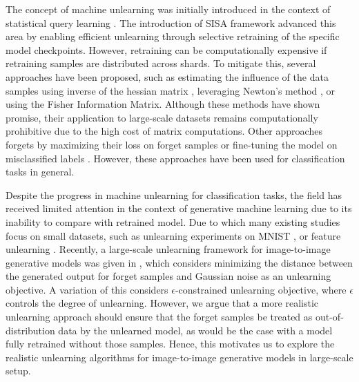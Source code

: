 
The concept of machine unlearning was initially introduced in the context of statistical query learning \cite{cao2015towards}. The introduction of SISA framework \cite{bourtoule2021machine} advanced this area by enabling efficient unlearning through selective retraining of the specific model checkpoints. However, retraining can be computationally expensive if retraining samples are distributed across shards. To mitigate this, several approaches have been proposed, such as estimating the influence of the data samples using inverse of the hessian matrix \cite{golatkar2020eternal}, leveraging Newton’s method \cite{guo2019certified}, or using the Fisher Information Matrix. Although these methods have shown promise, their application to large-scale datasets remains computationally prohibitive due to the high cost of matrix computations. Other approaches forgets by maximizing their loss on forget samples or fine-tuning the model on misclassified labels \cite{tarun2023deep, chen2023boundary}. However, these approaches have been used for classification tasks in general. 

Despite the progress in machine unlearning for classification tasks, the field has received limited attention in the context of generative machine learning \cite{liu2024machine} due to its inability to compare with retrained model. Due to which many existing studies focus on small datasets, such as unlearning experiments on MNIST \cite{bae2023gradient}, or feature unlearning \cite{moon2023feature}. Recently, a large-scale unlearning framework for image-to-image generative models was given in \cite{li2024machine}, which considers minimizing the distance between the generated output for forget samples and Gaussian noise as an unlearning objective. A variation of this \cite{feng2024controllable} considers $\epsilon$-constrained unlearning objective, where $\epsilon$ controls the degree of unlearning. However, we argue that a more realistic unlearning approach should ensure that the forget samples be treated as out-of-distribution data by the unlearned model, as would be the case with a model fully retrained without those samples. Hence, this motivates us to explore the realistic unlearning algorithms for image-to-image generative models in large-scale setup.

